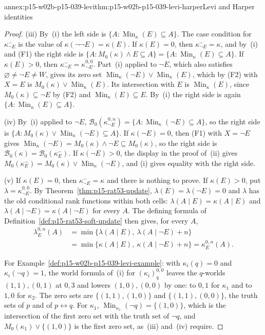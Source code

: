 \begin{annexitem}{annex:p15-w02b-p15-039-levi}{thm:p15-w02b-p15-039-levi-harper}{Levi and Harper identities}
\begin{proof}
(iii) By~(i) the left side is
\(\{A:\operatorname{Min}_\kappa(E)\subseteq A\}\).  The case condition for
\(\kappa^{-}_{\neg E}\) is the value of \(\kappa(\neg\neg E)=\kappa(E)\).
If \(\kappa(E)=0\), then \(\kappa^{-}_{\neg E}=\kappa\), and by~(i) and
(F1) the right side is
\(\{A:M_0(\kappa)\land E\subseteq A\}=\{A:\operatorname{Min}_\kappa(E)\subseteq A\}\).
If \(\kappa(E)>0\), then \(\kappa^{-}_{\neg E}=\kappa^{0,0}_{\neg E}\).  Part~(i)
applied to \(\neg E\), which also satisfies \(\varnothing\ne\neg E\ne W\),
gives its zero set
\(\operatorname{Min}_\kappa(\neg E)\lor\operatorname{Min}_\kappa(E)\), which
by (F2) with \(X=E\) is \(M_0(\kappa)\lor\operatorname{Min}_\kappa(E)\).  Its
intersection with \(E\) is \(\operatorname{Min}_\kappa(E)\), since
\(M_0(\kappa)\subseteq\neg E\) by (F2) and
\(\operatorname{Min}_\kappa(E)\subseteq E\).  By~(i) the right side is again
\(\{A:\operatorname{Min}_\kappa(E)\subseteq A\}\).

(iv) By~(i) applied to \(\neg E\),
\(\mathcal B_0(\kappa^{0,n}_{\neg E})=\{A:\operatorname{Min}_\kappa(\neg E)\subseteq A\}\),
so the right side is
\(\{A:M_0(\kappa)\lor\operatorname{Min}_\kappa(\neg E)\subseteq A\}\).
If \(\kappa(\neg E)=0\), then (F1) with \(X=\neg E\) gives
\(\operatorname{Min}_\kappa(\neg E)=M_0(\kappa)\land\neg E\subseteq M_0(\kappa)\),
so the right side is \(\mathcal B_0(\kappa)=\mathcal B_0(\kappa^{-}_E)\).
If \(\kappa(\neg E)>0\), the display in the proof of~(ii) gives
\(M_0(\kappa^{-}_E)=M_0(\kappa)\lor\operatorname{Min}_\kappa(\neg E)\), and
(i) gives equality with the right side.

(v) If \(\kappa(E)=0\), then \(\kappa^{-}_{\neg E}=\kappa\) and there is
nothing to prove.  If \(\kappa(E)>0\), put
\(\lambda=\kappa^{0,0}_{\neg E}\).  By Theorem~\ref{thm:p15-rat53-update},
\(\lambda(E)=\lambda(\neg E)=0\) and \(\lambda\) has the old conditional
rank functions within both cells:
\(\lambda(A\mid E)=\kappa(A\mid E)\) and
\(\lambda(A\mid\neg E)=\kappa(A\mid\neg E)\) for every \(A\).  The defining
formula of Definition~\ref{def:p15-rat53-soft-update} then gives, for every
\(A\),
\[
\begin{aligned}
 \lambda^{0,n}_E(A)&=\min\{\lambda(A\mid E),\ \lambda(A\mid\neg E)+n\}\\
 &=\min\{\kappa(A\mid E),\ \kappa(A\mid\neg E)+n\}=\kappa^{0,n}_E(A).
\end{aligned}
\]

For Example~\ref{def:p15-w02b-p15-039-levi-example}: with
\(\kappa_i(q)=0\) and \(\kappa_i(\neg q)=1\), the world formula of~(i) for
\((\kappa_i)^{0,0}_q\) leaves the \(q\)-worlds \((1,1),(0,1)\) at \(0,3\)
and lowers \((1,0),(0,0)\) by one: to \(0,1\) for \(\kappa_1\) and to
\(1,0\) for \(\kappa_2\).  The zero sets are \(\{(1,1),(1,0)\}\) and
\(\{(1,1),(0,0)\}\), the truth sets of \(p\) and of \(p\leftrightarrow q\).
For \(\kappa_1\), \(\operatorname{Min}_{\kappa_1}(\neg q)=\{(1,0)\}\), which
is the intersection of the first zero set with the truth set of \(\neg q\),
and \(M_0(\kappa_1)\lor\{(1,0)\}\) is the first zero set, as~(iii)
and~(iv) require.
\end{proof}
\end{annexitem}

